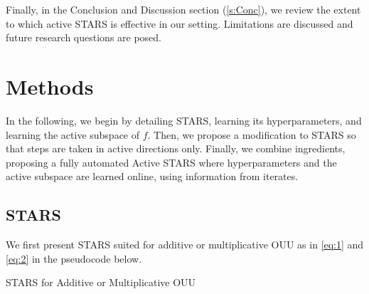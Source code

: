 \documentclass{amsart}
\begin{document}
Finally, in the Conclusion and Discussion section (\ref{s:Conc}), we review the extent to which active STARS is effective in our setting. Limitations are discussed and future research questions are posed. 

\section{Methods}  \label{s:Methods}

In the following, we begin by detailing STARS, learning its hyperparameters, and learning the active subspace of $f$. Then, we propose a modification to STARS so that steps are taken in active directions only. Finally, we combine ingredients, proposing a fully automated Active STARS where hyperparameters and the active subspace are learned online, using information from iterates.


\subsection{STARS}  \label{ss:methods_stars}

We first present STARS suited for additive or multiplicative OUU as in \eqref{eq:1} and \eqref{eq:2} in the  pseudocode below.

\vspace{.25cm}


\begin{algorithm}[H]

\SetAlgoLined

 


	\caption{STARS for Additive or Multiplicative OUU}

\end{algorithm}
\end{document}
